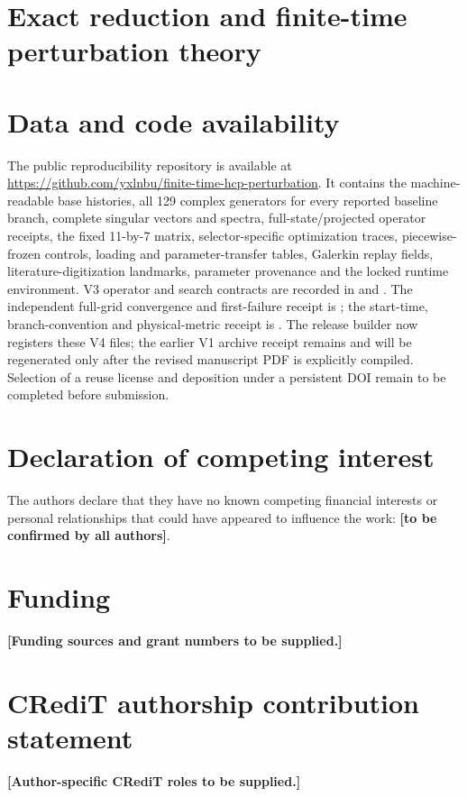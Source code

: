 \documentclass[preprint,12pt]{elsarticle}
\begin{document}
\section{Exact reduction and finite-time perturbation theory}
\label{sec:dynamic_theory}







\section*{Data and code availability}
The public reproducibility repository is available at \url{https://github.com/yxlnbu/finite-time-hcp-perturbation}. It contains the machine-readable base histories, all 129 complex generators for every reported baseline branch, complete singular vectors and spectra, full-state/projected operator receipts, the fixed 11-by-7 matrix, selector-specific optimization traces, piecewise-frozen controls, loading and parameter-transfer tables, Galerkin replay fields, literature-digitization landmarks, parameter provenance and the locked runtime environment. V3 operator and search contracts are recorded in  and . The independent full-grid convergence and first-failure receipt is ; the start-time, branch-convention and physical-metric receipt is . The release builder now registers these V4 files; the earlier V1 archive receipt remains  and will be regenerated only after the revised manuscript PDF is explicitly compiled. Selection of a reuse license and deposition under a persistent DOI remain to be completed before submission.

\section*{Declaration of competing interest}
The authors declare that they have no known competing financial interests or personal relationships that could have appeared to influence the work: \textbf{[to be confirmed by all authors]}.

\section*{Funding}
\textbf{[Funding sources and grant numbers to be supplied.]}

\section*{CRediT authorship contribution statement}
\textbf{[Author-specific CRediT roles to be supplied.]}

\appendix


\clearpage




\end{document}

